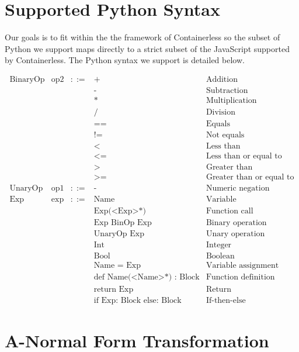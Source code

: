 \documentclass[acmsmall,review,authorversion]{acmart}
\begin{document}
\pagebreak
\section{Supported Python Syntax}
\label{section:pysyntax}

Our goals is to fit within the the framework of Containerless so the subset of Python we support maps directly to a strict subset of the JavaScript supported by Containerless. The Python syntax we support is detailed below.

\[\begin{array}{lrcll}
\text{BinaryOp} & \text{op2} & ::= & \text{+} & \text{Addition}
\\
&&& \text{-} & \text{Subtraction}
\\
&&& \text{*} & \text{Multiplication}
\\
&&& \text{/} & \text{Division}
\\
&&& \text{==} & \text{Equals}
\\
&&& \text{!=} & \text{Not equals}
\\
&&& \text{<} & \text{Less than}
\\
&&& \text{<=} & \text{Less than or equal to}
\\
&&& \text{>} & \text{Greater than}
\\
&&& \text{>=} & \text{Greater than or equal to}
\\
\text{UnaryOp} & \text{op1} & ::= & \text{-} & \text{Numeric negation}
\\
\text{Exp} & \text{exp} & ::= & \text{Name} & \text{Variable}
\\
&&& \text{Exp(<Exp>*)} & \text{Function call}
\\
&&& \text{Exp BinOp Exp} & \text{Binary operation}
\\
&&& \text{UnaryOp Exp} & \text{Unary operation}
\\
&&& \text{Int} & \text{Integer}
\\
&&& \text{Bool} & \text{Boolean}
\\
&&& \text{Name = Exp} & \text{Variable assignment}
\\
&&& \text{def Name(<Name>*) : Block} & \text{Function definition}
\\
&&& \text{return Exp} & \text{Return}
\\
&&& \text{if Exp: Block else: Block} & \text{If-then-else}
\end{array}\]

\section{A-Normal Form Transformation}
\end{document}
